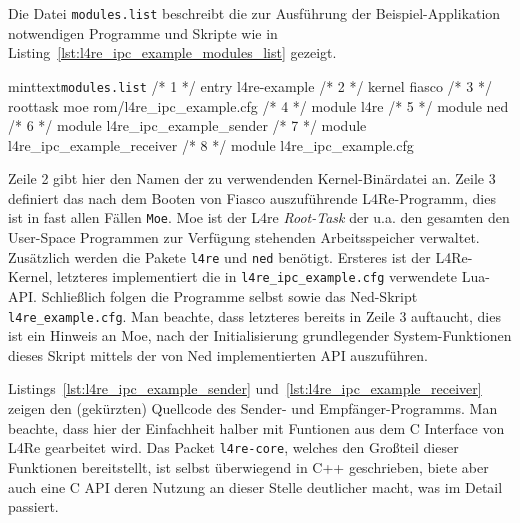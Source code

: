 Die Datei \texttt{modules.list}
beschreibt die zur Ausführung der Beispiel-Applikation notwendigen Programme und
Skripte wie in Listing~\ref{lst:l4re_ipc_example_modules_list} gezeigt.

\begin{mintlisting}[label=lst:l4re_ipc_example_modules_list]{minttext}{\texttt{modules.list}}
/* 1 */ entry l4re-example
/* 2 */ kernel fiasco
/* 3 */ roottask moe rom/l4re_ipc_example.cfg
/* 4 */ module l4re
/* 5 */ module ned
/* 6 */ module l4re_ipc_example_sender
/* 7 */ module l4re_ipc_example_receiver
/* 8 */ module l4re_ipc_example.cfg
\end{mintlisting}

Zeile 2 gibt hier den Namen der zu verwendenden Kernel-Binärdatei an. Zeile 3
definiert das nach dem Booten von Fiasco auszuführende L4Re-Programm, dies ist
in fast allen Fällen \texttt{Moe}. Moe ist der L4re \textit{Root-Task} der u.a.
den gesamten den User-Space Programmen zur Verfügung stehenden Arbeitsspeicher
verwaltet.  Zusätzlich werden die Pakete \texttt{l4re} und \texttt{ned}
benötigt. Ersteres ist der L4Re-Kernel, letzteres implementiert die in
\texttt{l4re\_ipc\_example.cfg} verwendete Lua-API.  Schließlich folgen die
Programme selbst sowie das Ned-Skript \texttt{l4re\_example.cfg}. Man beachte,
dass letzteres bereits in Zeile 3 auftaucht, dies ist ein Hinweis an Moe, nach
der Initialisierung grundlegender System-Funktionen dieses Skript mittels der
von Ned implementierten API auszuführen.

Listings~\ref{lst:l4re_ipc_example_sender}
und~\ref{lst:l4re_ipc_example_receiver} zeigen den (gekürzten) Quellcode des
Sender- und Empfänger-Programms. Man beachte, dass hier der Einfachheit halber
mit Funtionen aus dem C Interface von L4Re gearbeitet wird. Das Packet
\texttt{l4re-core}, welches den Großteil dieser Funktionen bereitstellt, ist
selbst überwiegend in C++ geschrieben, biete aber auch eine C API deren Nutzung
an dieser Stelle deutlicher macht, was im Detail passiert.

